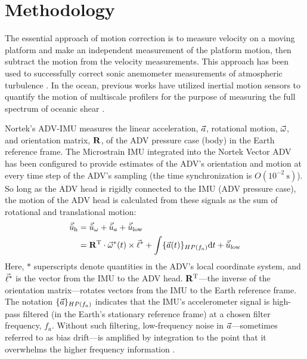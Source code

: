 
\section{Methodology}
\label{sec:methods}


\def\ue{\ensuremath{\vec{\tilde{u}}\earth}}


The essential approach of motion correction is to measure velocity on a moving platform and make an independent measurement of the platform motion, then subtract the motion from the velocity measurements. This approach has been used to successfully correct sonic anemometer measurements of atmospheric turbulence \cite[e.g., ][]{Edson++1998, Miller++2008}.  In the ocean, previous works have utilized inertial motion sensors to quantify the motion of multiscale profilers for the purpose of measuring the full spectrum of oceanic shear \cite[]{Winkel++1996}.

Nortek's ADV-IMU measures the linear acceleration, ${\vec{a}}$, rotational motion, $\vec{\omega}$, and orientation matrix, $\mathbf{R}$, of the ADV pressure case (body) in the Earth reference frame. The Microstrain IMU integrated into the Nortek Vector ADV has been configured to provide estimates of the ADV's orientation and motion at every time step of the ADV's sampling (the time synchronization is $O(10^{-2}\ \mathrm{s})$). So long as the ADV head is rigidly connected to the IMU (ADV pressure case), the motion of the ADV head is calculated from these signals as the sum of rotational and translational motion:
\begin{align}
  \label{eqn:uhead}
\begin{split}
  \uhead & = \urot + \uacc + \ulow \\
      & = \omatinv \cdot \AngRt^*(t)\times\l + \int \{\Accel(t)\}_{HP(f_{a})} \mathrm{d}t + \ulow
\end{split}
\end{align}
Here, $*$ superscripts denote quantities in the ADV's local coordinate system, and $\vec{\ell}^*$ is the vector from the IMU to the ADV head. $\mathbf{R}^\mathrm{T}$---the inverse of the orientation matrix---rotates vectors from the IMU to the Earth reference frame. The notation $\{{\vec{a}}\}_{HP(f_a)}$ indicates that the IMU's accelerometer signal is high-pass filtered (in the Earth's stationary reference frame) at a chosen filter frequency, $f_a$. Without such filtering, low-frequency noise in ${\vec{a}}$---sometimes referred to as bias drift---is amplified by integration to the point that it overwhelms the higher frequency information \cite[]{Barshan+Whyte1995, Bevly2004, Gulmammadov2009}.


